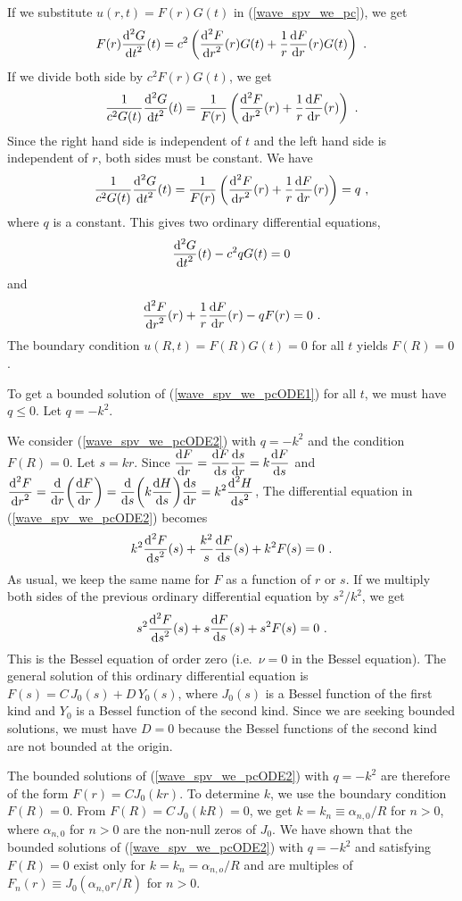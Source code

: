 \begin{egg}
If we substitute $u(r,t) = F(r)G(t)$ in (\ref{wave_spv_we_pc}), we get
\[
F(r)\dydxn{G}{t}{2}(t) = c^2 \left( \dydxn{F}{r}{2}(r)G(t) +
  \frac{1}{r} \dydx{F}{r}(r)G(t) \right) \ .
\]
If we divide both side by $c^2F(r)G(t)$, we get
\[
\frac{1}{c^2G(t)} \dydxn{G}{t}{2}(t) = \frac{1}{F(r)}
\left(\dydxn{F}{r}{2}(r) + \frac{1}{r} \dydx{F}{r}(r)\right) \ .
\]
Since the right hand side is independent of $t$ and the left hand side
is independent of $r$, both sides must be constant.  We have
\[
\frac{1}{c^2G(t)} \dydxn{G}{t}{2}(t) = \frac{1}{F(r)}
\left(\dydxn{F}{r}{2}(r) + \frac{1}{r} \dydx{F}{r}(r)\right) = q \ ,
\]
where $q$ is a constant.  This gives two ordinary differential equations,
\begin{equation} \label{wave_spv_we_pcODE1}
\dydxn{G}{t}{2}(t) - c^2 q G(t) = 0 
\end{equation}
and
\begin{equation} \label{wave_spv_we_pcODE2}
\dydxn{F}{r}{2}(r) + \frac{1}{r} \dydx{F}{r}(r) - q F(r) =0 \ .
\end{equation}
The boundary condition $u(R,t)=F(R)G(t)=0$ for all $t$ yields
$F(R)=0$.

To get a bounded solution of (\ref{wave_spv_we_pcODE1}) for all $t$, we
must have $q\leq 0$.  Let $q= -k^2$.

We consider (\ref{wave_spv_we_pcODE2}) with $q= -k^2$ and the condition
$F(R)=0$.  Let $s = kr$.  Since
$\displaystyle \dydx{F}{r} = \dydx{F}{s} \dydx{s}{r} = k\dydx{F}{s}$
and
$\displaystyle \dydxn{F}{r}{2} = \dfdx{\left(\dydx{F}{r}\right)}{r}
= \dfdx{\left(k\dydx{H}{s}\right)}{s} \dydx{s}{r}
= k^2 \dydxn{H}{s}{2}$,
The differential equation in (\ref{wave_spv_we_pcODE2}) becomes
\[
k^2\dydxn{F}{s}{2}(s) + \frac{k^2}{s} \dydx{F}{s}(s) + k^2 F(s) = 0 \ .
\]
As usual, we keep the same name for $F$ as a function of $r$ or $s$.
If we multiply both sides of the previous ordinary differential
equation by $s^2/k^2$, we get
\[
s^2\dydxn{F}{s}{2}(s) + s \dydx{F}{s}(s) + s^2 F(s) = 0 \ .
\]
This is the Bessel equation of order zero (i.e.\ $\nu=0$ in the Bessel
equation).  The general solution of this ordinary differential equation is
$F(s) = C\, J_0(s) + D\, Y_0(s)$, where $J_0(s)$ is a Bessel function of
the first kind and $Y_0$ is a Bessel function of the second kind.
Since we are seeking bounded solutions, we must have
$D = 0$ because the Bessel functions of the second kind are
not bounded at the origin.

The bounded solutions of (\ref{wave_spv_we_pcODE2}) with $q= -k^2$ are
therefore of the form $F(r) = C J_0\left(kr\right)$.  To determine
$k$, we use the boundary condition $F(R)=0$.  From
$F(R) = C\,J_0(kR)=0$, we get
$k = \displaystyle k_n \equiv \alpha_{n,0}/R$ for $n>0$,
where $\alpha_{n,0}$ for $n>0$ are the non-null zeros of $J_0$.
We have shown that the bounded solutions of (\ref{wave_spv_we_pcODE2}) with
$q= -k^2$ and satisfying $F(R)=0$ exist only for $k=k_n = \alpha_{n,o}/R$
and are multiples of
$\displaystyle F_n(r) \equiv J_0\left(\alpha_{n,0}r/R\right)$
for $n>0$.


\end{egg}
